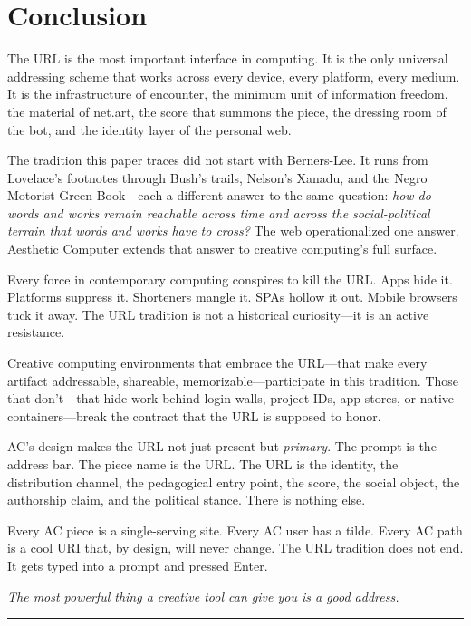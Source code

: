 \documentclass[10pt,letterpaper,twocolumn]{article}
\begin{document}
\section{Conclusion}

The URL is the most important interface in computing. It is the only universal addressing scheme that works across every device, every platform, every medium. It is the infrastructure of encounter, the minimum unit of information freedom, the material of net.art, the score that summons the piece, the dressing room of the bot, and the identity layer of the personal web.

The tradition this paper traces did not start with Berners-Lee. It runs from Lovelace's footnotes through Bush's trails, Nelson's Xanadu, and the Negro Motorist Green Book---each a different answer to the same question: \emph{how do words and works remain reachable across time and across the social-political terrain that words and works have to cross?} The web operationalized one answer. Aesthetic Computer extends that answer to creative computing's full surface.

Every force in contemporary computing conspires to kill the URL. Apps hide it. Platforms suppress it. Shorteners mangle it. SPAs hollow it out. Mobile browsers tuck it away. The URL tradition is not a historical curiosity---it is an active resistance.

Creative computing environments that embrace the URL---that make every artifact addressable, shareable, memorizable---participate in this tradition. Those that don't---that hide work behind login walls, project IDs, app stores, or native containers---break the contract that the URL is supposed to honor.

AC's design makes the URL not just present but \emph{primary}. The prompt is the address bar. The piece name is the URL. The URL is the identity, the distribution channel, the pedagogical entry point, the score, the social object, the authorship claim, and the political stance. There is nothing else.

Every AC piece is a single-serving site. Every AC user has a tilde. Every AC path is a cool URI that, by design, will never change. The URL tradition does not end. It gets typed into a prompt and pressed Enter.

\vspace{0.3em}
\noindent\emph{The most powerful thing a creative tool can give you is a good address.}

\vspace{1em}
\noindent\rule{\columnwidth}{0.5pt}



\end{document}
